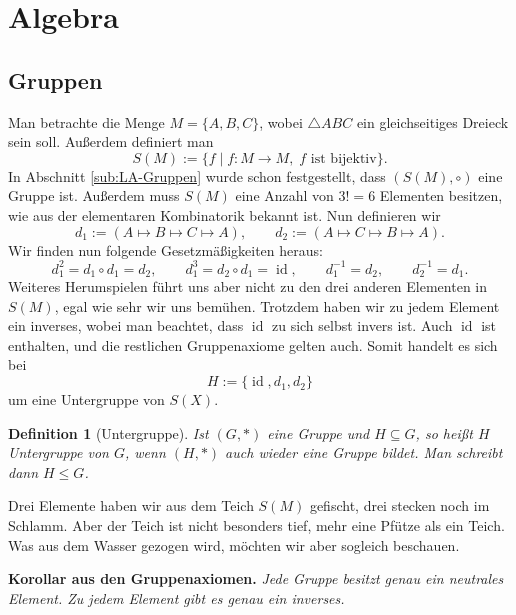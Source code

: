 \documentclass[a4paper,11pt,fleqn,twoside]{scrartcl}
\numberwithin{equation}{section}
\newcommand{\id}{\operatorname{id}}
\newcommand{\strong}[1]{{\normalfont\sffamily\bfseries #1}}
\theoremstyle{rmbox}
\newtheorem{Definition}{Definition}
\begin{document}
\section{Algebra}
\subsection{Gruppen}
Man betrachte die Menge $M=\{A,B,C\}$, wobei $\triangle ABC$ ein
gleichseitiges Dreieck sein soll. Außerdem definiert man
\begin{equation}
S(M) := \{f\mid f\colon M\to M,\;\text{$f$ ist bijektiv}\}.
\end{equation}
In Abschnitt \ref{sub:LA-Gruppen} wurde schon festgestellt,
dass $(S(M),\circ)$ eine Gruppe ist. Außerdem muss $S(M)$ eine
Anzahl von $3!=6$ Elementen besitzen, wie aus der elementaren
Kombinatorik bekannt ist. Nun definieren wir
\begin{equation}
d_1 := (A \mapsto B \mapsto C\mapsto A),\qquad d_2:=(A\mapsto C\mapsto B\mapsto A).
\end{equation}
Wir finden nun folgende Gesetzmäßigkeiten heraus:
\begin{equation}
d_1^2 = d_1\circ d_1 = d_2, \qquad d_1^3 = d_2\circ d_1 = \id, \qquad d_1^{-1}=d_2,\qquad d_2^{-1}=d_1.
\end{equation}
Weiteres Herumspielen führt uns aber nicht zu den drei anderen
Elementen in $S(M)$, egal wie sehr wir uns bemühen. Trotzdem
haben wir zu jedem Element ein inverses, wobei man beachtet,
dass $\id$ zu sich selbst invers ist. Auch $\id$ ist enthalten,
und die restlichen Gruppenaxiome gelten auch. Somit handelt es sich
bei
\begin{equation}\label{eq:Drehungen}
H := \{\id,d_1,d_2\}
\end{equation}
um eine Untergruppe von $S(X)$.

\begin{Definition}[Untergruppe]
Ist $(G,*)$ eine Gruppe und $H\subseteq G$, so heißt $H$
\emph{Untergruppe} von $G$, wenn $(H,*)$ auch wieder eine Gruppe
bildet. Man schreibt dann $H\le G$.
\end{Definition}
Drei Elemente haben wir aus dem Teich $S(M)$ gefischt, drei
stecken noch im Schlamm. Aber der Teich ist nicht besonders tief,
mehr eine Pfütze als ein Teich. Was aus dem Wasser gezogen wird,
möchten wir aber sogleich beschauen.

\strong{Korollar aus den Gruppenaxiomen.} \emph{Jede Gruppe
besitzt genau ein neutrales Element. Zu jedem Element gibt
es genau ein inverses.}
\end{document}
